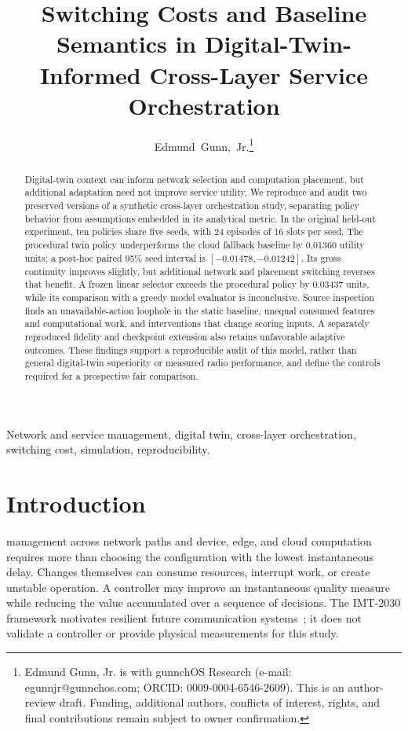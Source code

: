 \documentclass[letterpaper,journal]{IEEEtran}
\title{Switching Costs and Baseline Semantics in Digital-Twin-Informed Cross-Layer Service Orchestration}
\author{Edmund~Gunn,~Jr.\thanks{Edmund Gunn, Jr. is with gunnchOS Research (e-mail: egunnjr@gunnchos.com; ORCID: 0009-0004-6546-2609). This is an author-review draft. Funding, additional authors, conflicts of interest, rights, and final contributions remain subject to owner confirmation.}}
\begin{document}
\maketitle
\begin{abstract}
Digital-twin context can inform network selection and computation placement, but additional adaptation need not improve service utility. We reproduce and audit two preserved versions of a synthetic cross-layer orchestration study, separating policy behavior from assumptions embedded in its analytical metric. In the original held-out experiment, ten policies share five seeds, with 24 episodes of 16 slots per seed. The procedural twin policy underperforms the cloud fallback baseline by 0.01360 utility units; a post-hoc paired 95\% seed interval is $[-0.01478,-0.01242]$. Its gross continuity improves slightly, but additional network and placement switching reverses that benefit. A frozen linear selector exceeds the procedural policy by 0.03437 units, while its comparison with a greedy model evaluator is inconclusive. Source inspection finds an unavailable-action loophole in the static baseline, unequal consumed features and computational work, and interventions that change scoring inputs. A separately reproduced fidelity and checkpoint extension also retains unfavorable adaptive outcomes. These findings support a reproducible audit of this model, rather than general digital-twin superiority or measured radio performance, and define the controls required for a prospective fair comparison.
\end{abstract}
\begin{IEEEkeywords}
Network and service management, digital twin, cross-layer orchestration, switching cost, simulation, reproducibility.
\end{IEEEkeywords}

\section{Introduction}
 management across network paths and device, edge, and cloud computation requires more than choosing the configuration with the lowest instantaneous delay. Changes themselves can consume resources, interrupt work, or create unstable operation. A controller may improve an instantaneous quality measure while reducing the value accumulated over a sequence of decisions. The IMT-2030 framework motivates resilient future communication systems~\cite{itur2023framework}; it does not validate a controller or provide physical measurements for this study.
\end{document}
